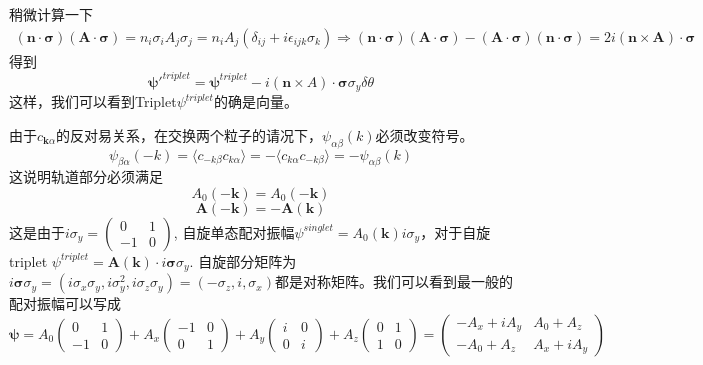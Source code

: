 \documentclass{article}
\numberwithin{equation}{subsection}
\newcommand{\mk}{\mathbf{k}}
\newcommand{\mn}{\mathbf{n}}
\newcommand{\mpsi}{\bm{\psi}}
\newcommand{\msigma}{\bm{\sigma}}
\begin{document}
稍微计算一下
\begin{equation}
    \begin{split}
        (\mn\cdot\msigma)(\mathbf{A}\cdot\msigma)=n_i\sigma_iA_j\sigma_j=n_iA_j(\delta_{ij}+i\epsilon_{ijk}\sigma_k)\Rightarrow(\mn\cdot\msigma)(\mathbf{A}\cdot\msigma)-(\mathbf{A}\cdot\msigma)(\mn\cdot\msigma)=2i(\mn\times\mathbf{A})\cdot\msigma
    \end{split}
\end{equation}
得到
\begin{equation}
    \mpsi'^{triplet}=\mpsi^{triplet}-i(\mn\times A)\cdot\msigma\sigma_y\delta\theta
\end{equation}
这样，我们可以看到Triplet$\psi^{triplet}$的确是向量。

由于$c_{\mk\alpha}$的反对易关系，在交换两个粒子的请况下，$\psi_{\alpha\beta}(k)$必须改变符号。
\begin{equation}
    \psi_{\beta\alpha}(-k)=\langle c_{-k\beta}c_{k\alpha}\rangle=-\langle c_{k\alpha}c_{-k\beta}\rangle=-\psi_{\alpha\beta}(k)
\end{equation}
这说明轨道部分必须满足
\begin{equation}
    A_0(-\mk)=A_0(-\mk)
\end{equation}
\begin{equation}
    \mathbf{A}(-\mk)=-\mathbf{A}(\mk)
\end{equation}
这是由于$i\sigma_y=\begin{pmatrix}
    0&1\\
    -1&0
\end{pmatrix}$, 自旋单态配对振幅$\psi^{singlet}=A_0(\mk)i\sigma_y$，对于自旋triplet $\psi^{triplet}=\mathbf{A}(\mk)\cdot i\msigma\sigma_y$. 自旋部分矩阵为$i\msigma\sigma_y=(i\sigma_x\sigma_y,i\sigma_y^2,i\sigma_z\sigma_y)=(-\sigma_z,i,\sigma_x)$都是对称矩阵。我们可以看到最一般的配对振幅可以写成
\begin{equation}
    \mpsi=A_0\begin{pmatrix}
        0&1\\
        -1&0
    \end{pmatrix}+A_x\begin{pmatrix}
        -1&0\\
        0&1
    \end{pmatrix}+A_y\begin{pmatrix}
        i&0\\
        0&i
    \end{pmatrix}+A_z\begin{pmatrix}
        0&1\\
        1&0
    \end{pmatrix}=\begin{pmatrix}
        -A_x+iA_y&A_0+A_z\\
        -A_0+A_z&A_x+iA_y
    \end{pmatrix}
\end{equation}
\end{document}

